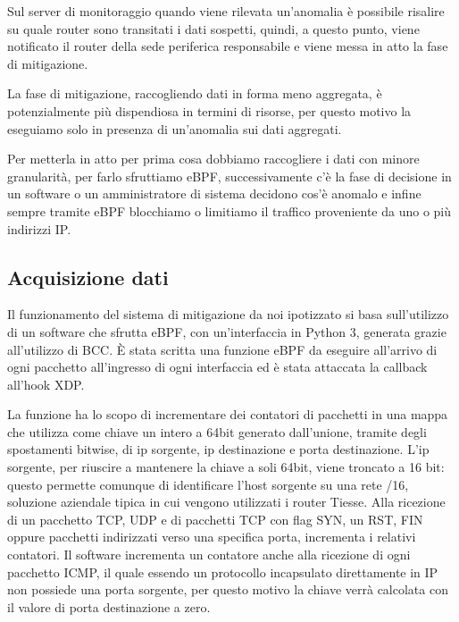 Sul server di monitoraggio quando viene rilevata un'anomalia è possibile risalire su quale router sono transitati i dati sospetti, quindi, a questo punto, viene notificato il router della sede periferica responsabile e viene messa in atto la fase di mitigazione.

La fase di mitigazione, raccogliendo dati in forma meno aggregata, è potenzialmente più dispendiosa in termini di risorse, per questo motivo la eseguiamo solo in presenza di un'anomalia sui dati aggregati.

Per metterla in atto per prima cosa dobbiamo raccogliere i dati con minore granularità, per farlo sfruttiamo eBPF, successivamente c'è la fase di decisione in un software o un amministratore di sistema decidono cos'è anomalo e infine sempre tramite eBPF blocchiamo o limitiamo il traffico proveniente da uno o più indirizzi IP.

\subsection{Acquisizione dati}

Il funzionamento del sistema di mitigazione da noi ipotizzato si basa sull'utilizzo di un software che sfrutta eBPF, con un'interfaccia in Python 3, generata grazie all'utilizzo di BCC.
È stata scritta una funzione eBPF da eseguire all'arrivo di ogni pacchetto all'ingresso di ogni interfaccia ed è stata attaccata la callback all'hook XDP.

La funzione ha lo scopo di incrementare dei contatori di pacchetti in una mappa che utilizza come chiave un intero a 64bit generato dall'unione, tramite degli spostamenti bitwise, di ip sorgente, ip destinazione e porta destinazione. L'ip sorgente, per riuscire a mantenere la chiave a soli 64bit, viene troncato a 16 bit: questo permette comunque di identificare l'host sorgente su una rete /16, soluzione aziendale tipica in cui vengono utilizzati i router Tiesse.
Alla ricezione di un pacchetto TCP, UDP e di pacchetti TCP con flag SYN, un RST, FIN oppure pacchetti indirizzati verso una specifica porta, incrementa i relativi contatori. Il software incrementa un contatore anche alla ricezione di ogni pacchetto ICMP, il quale essendo un protocollo incapsulato direttamente in IP non possiede una porta sorgente, per questo motivo la chiave verrà calcolata con il valore di porta destinazione a zero.


